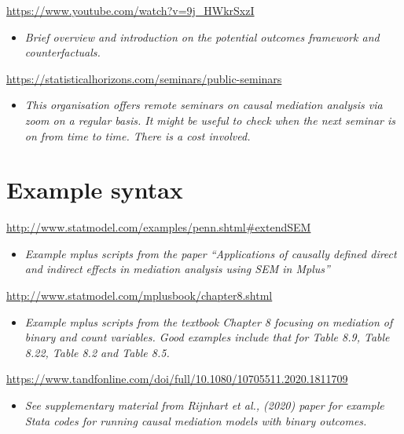 \documentclass[
]{book}
\providecommand{\tightlist}{%
  \setlength{\itemsep}{0pt}\setlength{\parskip}{0pt}}
\begin{document}
\url{https://www.youtube.com/watch?v=9j_HWkrSxzI}

\begin{itemize}
\tightlist
\item
  \emph{Brief overview and introduction on the potential outcomes framework and counterfactuals.}
\end{itemize}

\url{https://statisticalhorizons.com/seminars/public-seminars}

\begin{itemize}
\tightlist
\item
  \emph{This organisation offers remote seminars on causal mediation analysis via zoom on a regular basis. It might be useful to check when the next seminar is on from time to time. There is a cost involved.}
\end{itemize}

\section{Example syntax}\label{example-syntax-1}

\url{http://www.statmodel.com/examples/penn.shtml\#extendSEM}

\begin{itemize}
\tightlist
\item
  \emph{Example mplus scripts from the paper ``Applications of causally defined direct and indirect effects in mediation analysis using SEM in Mplus''}
\end{itemize}

\url{http://www.statmodel.com/mplusbook/chapter8.shtml}

\begin{itemize}
\tightlist
\item
  \emph{Example mplus scripts from the textbook Chapter 8 focusing on mediation of binary and count variables. Good examples include that for Table 8.9, Table 8.22, Table 8.2 and Table 8.5.}
\end{itemize}

\url{https://www.tandfonline.com/doi/full/10.1080/10705511.2020.1811709}

\begin{itemize}
\tightlist
\item
  \emph{See supplementary material from Rijnhart et al., (2020) paper for example Stata codes for running causal mediation models with binary outcomes.}
\end{itemize}
\end{document}

